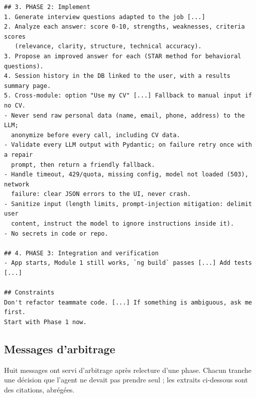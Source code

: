 \begin{lstlisting}[style=adamprompt]
## 3. PHASE 2: Implement
1. Generate interview questions adapted to the job [...]
2. Analyze each answer: score 0-10, strengths, weaknesses, criteria scores
   (relevance, clarity, structure, technical accuracy).
3. Propose an improved answer for each (STAR method for behavioral questions).
4. Session history in the DB linked to the user, with a results summary page.
5. Cross-module: option "Use my CV" [...] Fallback to manual input if no CV.
- Never send raw personal data (name, email, phone, address) to the LLM;
  anonymize before every call, including CV data.
- Validate every LLM output with Pydantic; on failure retry once with a repair
  prompt, then return a friendly fallback.
- Handle timeout, 429/quota, missing config, model not loaded (503), network
  failure: clear JSON errors to the UI, never crash.
- Sanitize input (length limits, prompt-injection mitigation: delimit user
  content, instruct the model to ignore instructions inside it).
- No secrets in code or repo.

## 4. PHASE 3: Integration and verification
- App starts, Module 1 still works, `ng build` passes [...] Add tests [...]

## Constraints
Don't refactor teammate code. [...] If something is ambiguous, ask me first.
Start with Phase 1 now.
\end{lstlisting}

\subsection{Messages d'arbitrage}

Huit messages ont servi d'arbitrage après relecture d'une phase. Chacun tranche
une décision que l'agent ne devait pas prendre seul ; les extraits ci-dessous
sont des citations, abrégées.


